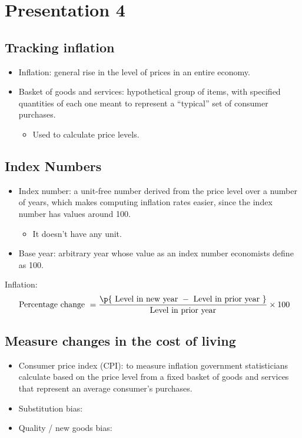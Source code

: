 \documentclass[openany]{book}
\begin{document}
\chapter{Presentation 4}
\section{Tracking inflation}
\begin{itemize}
    \item Inflation: general rise in the level of prices in an entire economy.  
    \item Basket of goods and services: hypothetical group of items, with specified quantities of each one meant to represent a ``typical'' set of consumer purchases.
        \begin{itemize}
            \item Used to calculate price levels. 
        \end{itemize}
\end{itemize}

\section{Index Numbers}
\begin{itemize}
    \item Index number: a unit-free number derived from the price level over a number of years, which makes computing inflation rates easier, since the index number has values around 100.
        \begin{itemize}
            \item It doesn't have any unit.
        \end{itemize}
    \item Base year: arbitrary year whose value as an index number economists define as 100.
\end{itemize}
Inflation: 
\[
  \text{ Percentage change } = \frac{\p{\text{ Level in new year } - \text{ Level in prior year }} }{\text{ Level in prior year }} \times 100
\]

\section{Measure changes in the cost of living}
\begin{itemize}
    \item Consumer price index (CPI): to measure inflation government statisticians calculate based on the price level from a fixed basket of goods and services that represent an average consumer's purchases. 
    \item Substitution bias: 
    \item Quality / new goods bias:  
\end{itemize}
\end{document}
